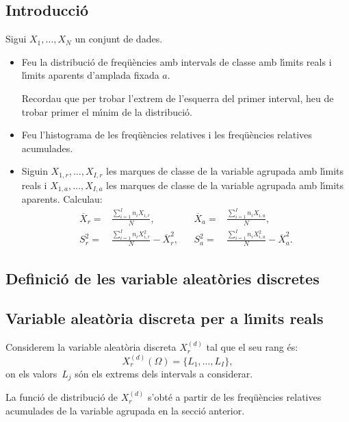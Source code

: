 \subsection{Introducci\'o}

Sigui $X_1,\ldots,X_N$ un conjunt de dades.

\begin{itemize}
\item Feu la distribuci\'o 
de freq\"u\`encies amb 
intervals de classe amb l\'{\i}mits reals
 i l\'{\i}mits aparents
 d'amplada fixada $a$. 

Recordau que per trobar l'extrem de l'esquerra del primer 
interval, heu de trobar primer el m\'{\i}nim de 
la distribuci\'o.

\item Feu l'histograma de les freq\"u\`encies
 relatives i les 
freq\"u\`encies
relatives acumulades.

\item Siguin $X_{1,r},\ldots,X_{I,r}$ les marques 
de classe de la variable agrupada amb l\'{\i}mits 
reals i $X_{1,a},\ldots,X_{I,a}$
les marques de classe de la variable agrupada
 amb l\'{\i}mits 
aparents. Calculau:
\[
\begin{array}{rlcrl}
\overline{X}_r = & \frac{\sum\limits_{i=1}^I n_i X_{i,r}}{N}, 
& &\overline{X}_a = & \frac{\sum\limits_{i=1}^I n_i X_{i,a}}{N}, \\
S_r^2 = & \frac{\sum\limits_{i=1}^I n_i X_{i,r}^2}{N}- 
\overline{X}_r^2,
& & S_a^2 = & \frac{\sum\limits_{i=1}^I n_i X_{i,a}^2}{N}- 
\overline{X}_a^2.
\end{array}
\]
\end{itemize}

\subsection{Definici\'o de les variable aleat\`ories discretes
}

\subsection*{Variable aleat\`oria 
discreta per a l\'{\i}mits reals}

Considerem la variable aleat\`oria discreta
 $X_r^{(d)}$ tal que 
el seu rang \'es:
\[
X_r^{(d)} (\Omega) =\{L_1,\ldots,L_I\},
\]
on els valors~$L_j$ s\'on els extrems dels intervals a considerar.

La funci\'o de distribuci\'o de $X_r^{(d)}$ 
s'obt\'e a partir de les freq\"u\`encies
 relatives 
acumulades de la variable agrupada
en la secci\'o anterior.

